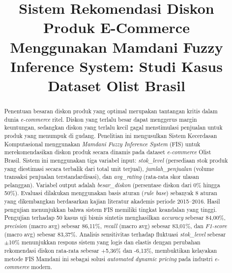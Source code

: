 \documentclass[conference]{IEEEtran}
\begin{document}
\title{Sistem Rekomendasi Diskon Produk E-Commerce Menggunakan Mamdani Fuzzy Inference System: Studi Kasus Dataset Olist Brasil}

\author{
\and
{}
}

\maketitle

\begin{abstract}
Penentuan besaran diskon produk yang optimal merupakan tantangan kritis dalam dunia \textit{e-commerce} ritel. Diskon yang terlalu besar dapat menggerus margin keuntungan, sedangkan diskon yang terlalu kecil gagal menstimulasi penjualan untuk produk yang menumpuk di gudang. Penelitian ini mengusulkan Sistem Kecerdasan Komputasional menggunakan \textit{Mamdani Fuzzy Inference System} (FIS) untuk merekomendasikan diskon produk secara dinamis pada dataset \textit{e-commerce} Olist Brasil. Sistem ini menggunakan tiga variabel input: \textit{stok\_level} (persediaan stok produk yang diestimasi secara terbalik dari total unit terjual), \textit{jumlah\_penjualan} (volume transaksi penjualan terstandardisasi), dan \textit{avg\_rating} (rata-rata skor ulasan pelanggan). Variabel output adalah \textit{besar\_diskon} (persentase diskon dari 0\% hingga 50\%). Evaluasi dilakukan menggunakan basis aturan (\textit{rule base}) sebanyak 8 aturan yang dikembangkan berdasarkan kajian literatur akademis periode 2015--2016. Hasil pengujian menunjukkan bahwa sistem FIS memiliki tingkat keandalan yang tinggi. Pengujian terhadap 50 kasus uji bisnis sintetis menghasilkan \textit{accuracy} sebesar 84,00\%, \textit{precision} (macro avg) sebesar 86,11\%, \textit{recall} (macro avg) sebesar 83,01\%, dan \textit{F1-score} (macro avg) sebesar 83,37\%. Analisis sensitivitas terhadap fluktuasi \textit{stok\_level} sebesar $\pm$10\% menunjukkan respons sistem yang logis dan elastis dengan perubahan rekomendasi diskon rata-rata sebesar +5,36\% dan -6,13\%, membuktikan kelayakan metode FIS Mamdani ini sebagai solusi \textit{automated dynamic pricing} pada industri \textit{e-commerce} modern.
\end{abstract}
\end{document}
